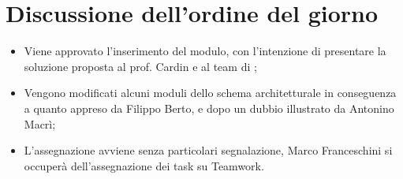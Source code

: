 \documentclass[../verbale-2017-02-16.tex]{subfiles}
\begin{document}
	\section{Discussione dell'ordine del giorno}
	\begin{itemize}
		\item Viene approvato l'inserimento del modulo, con l'intenzione di presentare la soluzione proposta al prof. Cardin e al team di \prop;
		\item Vengono modificati alcuni moduli dello schema architetturale in conseguenza a quanto appreso da Filippo Berto, e dopo un dubbio illustrato da Antonino Macrì;
		\item L'assegnazione avviene senza particolari segnalazione, Marco Franceschini si occuperà dell'assegnazione dei task su Teamwork.
	\end{itemize}
\end{document}
